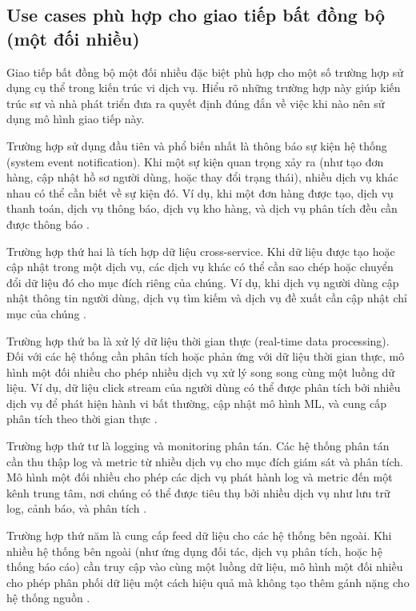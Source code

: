 \subsection{Use cases phù hợp cho giao tiếp bất đồng bộ (một đối nhiều)}
Giao tiếp bất đồng bộ một đối nhiều đặc biệt phù hợp cho một số trường hợp sử dụng cụ thể trong kiến trúc vi dịch vụ. Hiểu rõ những trường hợp này giúp kiến trúc sư và nhà phát triển đưa ra quyết định đúng đắn về việc khi nào nên sử dụng mô hình giao tiếp này.

Trường hợp sử dụng đầu tiên và phổ biến nhất là thông báo sự kiện hệ thống (system event notification). Khi một sự kiện quan trọng xảy ra (như tạo đơn hàng, cập nhật hồ sơ người dùng, hoặc thay đổi trạng thái), nhiều dịch vụ khác nhau có thể cần biết về sự kiện đó. Ví dụ, khi một đơn hàng được tạo, dịch vụ thanh toán, dịch vụ thông báo, dịch vụ kho hàng, và dịch vụ phân tích đều cần được thông báo \cite{newman2015}.

Trường hợp thứ hai là tích hợp dữ liệu cross-service. Khi dữ liệu được tạo hoặc cập nhật trong một dịch vụ, các dịch vụ khác có thể cần sao chép hoặc chuyển đổi dữ liệu đó cho mục đích riêng của chúng. Ví dụ, khi dịch vụ người dùng cập nhật thông tin người dùng, dịch vụ tìm kiếm và dịch vụ đề xuất cần cập nhật chỉ mục của chúng \cite{richardson2019}.

Trường hợp thứ ba là xử lý dữ liệu thời gian thực (real-time data processing). Đối với các hệ thống cần phân tích hoặc phản ứng với dữ liệu thời gian thực, mô hình một đối nhiều cho phép nhiều dịch vụ xử lý song song cùng một luồng dữ liệu. Ví dụ, dữ liệu click stream của người dùng có thể được phân tích bởi nhiều dịch vụ để phát hiện hành vi bất thường, cập nhật mô hình ML, và cung cấp phân tích theo thời gian thực \cite{goodhope2012}.

Trường hợp thứ tư là logging và monitoring phân tán. Các hệ thống phân tán cần thu thập log và metric từ nhiều dịch vụ cho mục đích giám sát và phân tích. Mô hình một đối nhiều cho phép các dịch vụ phát hành log và metric đến một kênh trung tâm, nơi chúng có thể được tiêu thụ bởi nhiều dịch vụ như lưu trữ log, cảnh báo, và phân tích \cite{aksakalli2021}.

Trường hợp thứ năm là cung cấp feed dữ liệu cho các hệ thống bên ngoài. Khi nhiều hệ thống bên ngoài (như ứng dụng đối tác, dịch vụ phân tích, hoặc hệ thống báo cáo) cần truy cập vào cùng một luồng dữ liệu, mô hình một đối nhiều cho phép phân phối dữ liệu một cách hiệu quả mà không tạo thêm gánh nặng cho hệ thống nguồn \cite{beyer2018}.

